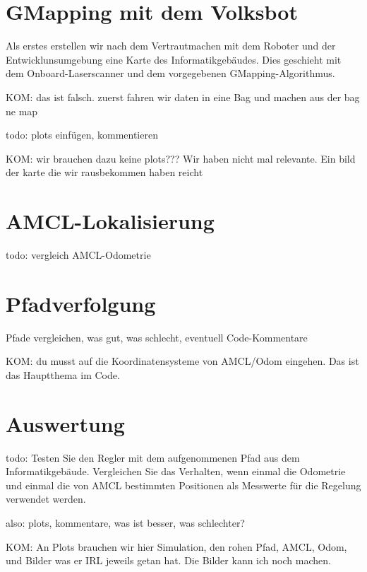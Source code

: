 \documentclass[11pt,a4paper]{article}
\begin{document}
\newpage

\section{GMapping mit dem Volksbot}
Als erstes erstellen wir nach dem Vertrautmachen mit dem Roboter und der Entwicklunsumgebung eine Karte des Informatikgebäudes. 
Dies geschieht mit dem Onboard-Laserscanner und dem vorgegebenen GMapping-Algorithmus.

KOM: das ist falsch. zuerst fahren wir daten in eine Bag und machen aus der bag ne map

todo: plots einfügen, kommentieren

KOM: wir brauchen dazu keine plots??? Wir haben nicht mal relevante. Ein bild der karte die wir rausbekommen haben reicht

\section{AMCL-Lokalisierung}
todo: vergleich AMCL-Odometrie

\section{Pfadverfolgung}
Pfade vergleichen, was gut, was schlecht, eventuell Code-Kommentare 

KOM: du musst auf die Koordinatensysteme von AMCL/Odom eingehen. Das ist das Hauptthema im Code.

\section{Auswertung}
todo: 
Testen Sie den Regler mit dem aufgenommenen Pfad aus dem Informatikgebäude. Vergleichen Sie das Verhalten, wenn einmal die Odometrie und einmal die von AMCL bestimmten
Positionen als Messwerte für die Regelung verwendet werden.

also: plots, kommentare, was ist besser, was schlechter?

KOM: An Plots brauchen wir hier Simulation, den rohen Pfad, AMCL, Odom, und Bilder was er IRL jeweils getan hat. Die Bilder kann ich noch machen.
\end{document}
